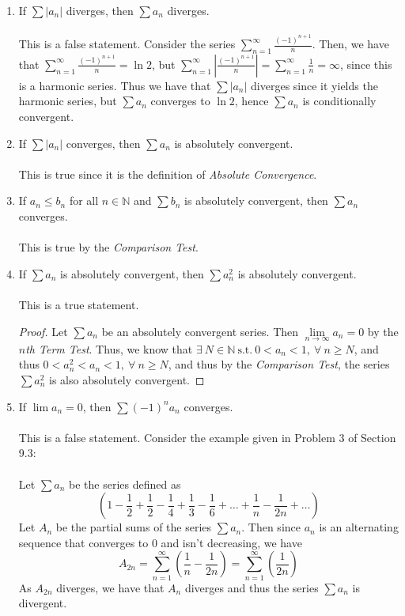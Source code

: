 \documentclass[12pt,letterpaper]{article}
\newcommand{\limx}[2]{\displaystyle\lim\limits_{#1 \to #2}}
\newcommand{\st}{\ \text{s.t.}\ }
\newcommand{\abs}[1]{\left\lvert #1 \right\rvert}
\newcommand{\N}{\mathbb{N}}
\theoremstyle{case}
\theoremstyle{definition}
\begin{document}
\begin{enumerate}
\begin{enumerate}
			\item If $\sum |a_n|$ diverges, then $\sum a_n$ diverges.
			\\\\This is a false statement. Consider the series $\displaystyle\sum_{n=1}^{\infty} \frac{(-1)^{n+1}}{n}$. Then, we have that $\displaystyle\sum_{n=1}^{\infty} \frac{(-1)^{n+1}}{n} = \ln 2$, but $\displaystyle\sum_{n=1}^{\infty} \abs{\frac{(-1)^{n+1}}{n}} = \displaystyle\sum_{n=1}^{\infty} \frac{1}{n} = \infty$, since this is a harmonic series. Thus we have that $\sum |a_n|$ diverges since it yields the harmonic series, but $\sum a_n$ converges to $\ln 2$, hence $\sum a_n$ is conditionally convergent.\\
			
			\item If $\sum |a_n|$ converges, then $\sum a_n$ is absolutely convergent.
			\\\\This is true since it is the definition of \textit{Absolute Convergence}.\\
			
			\item If $a_n \leq b_n$ for all $n \in \N$ and $\sum b_n$ is absolutely convergent, then $\sum a_n$ converges.
			\\\\This is true by the \textit{Comparison Test}.\\
			
			\item If $\sum a_n$ is absolutely convergent, then $\sum a_n^2$ is absolutely convergent.
			\\\\This is a true statement.
			\begin{proof}
				Let $\sum a_n$ be an absolutely convergent series. Then $\limx{n}{\infty} a_n=0$ by the \textit{$n$th Term Test}. Thus, we know that $\exists\ N \in \N \st 0 < a_n < 1,\ \forall\ n \geq N$, and thus $0 < a_n^2<a_n<1,\ \forall\ n \geq N$, and thus by the \textit{Comparison Test}, the series $\sum a_n^2$ is also absolutely convergent.
			\end{proof}
			
			\item If $\lim a_n = 0$, then $\sum (-1)^na_n$ converges.
			\\\\This is a false statement. Consider the example given in Problem 3 of Section 9.3:
			\\\\Let $\sum a_n$ be the series defined as
			\[\left(1-\frac{1}{2}+\frac{1}{2}-\frac{1}{4}+\frac{1}{3}-\frac{1}{6}+\dots+\frac{1}{n}-\frac{1}{2n}+\dots\right)\]
			Let $A_n$ be the partial sums of the series $\sum a_n$. Then since $a_n$ is an alternating sequence that converges to 0 and isn't decreasing, we have
			\[A_{2n}=\sum_{n=1}^{\infty} \left(\frac{1}{n}-\frac{1}{2n}\right) = \sum_{n=1}^{\infty} \left(\frac{1}{2n}\right)\]
			As $A_{2n}$ diverges, we have that $A_n$ diverges and thus the series $\sum a_n$ is divergent.\\
			

\end{enumerate}
\end{enumerate}
\end{document}
